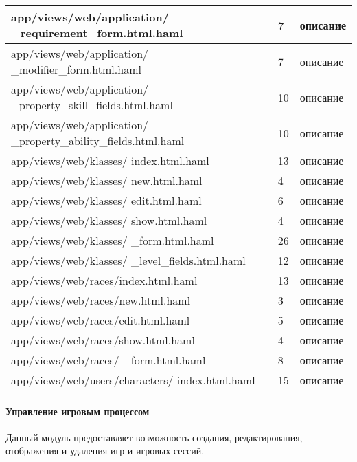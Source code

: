 \begin{longtable}[h]{| p{} | p{} | p{} |}
  \hline
  app/views/web/application/ \_requirement\_form.html.haml  &  7  &  описание \\
  \hline
  app/views/web/application/ \_modifier\_form.html.haml  &  7  &  описание \\
  \hline
  app/views/web/application/ \_property\_skill\_fields.html.haml  &  10  &  описание \\
  \hline
  app/views/web/application/ \_property\_ability\_fields.html.haml  &  10  &  описание \\
  \hline
  app/views/web/klasses/ index.html.haml  &  13  &  описание \\
  \hline
  app/views/web/klasses/ new.html.haml  &  4  &  описание \\
  \hline
  app/views/web/klasses/ edit.html.haml  &  6  &  описание \\
  \hline
  app/views/web/klasses/ show.html.haml  &  4  &  описание \\
  \hline
  app/views/web/klasses/ \_form.html.haml  &  26  &  описание \\
  \hline
  app/views/web/klasses/ \_level\_fields.html.haml  &  12  &  описание \\
  \hline
  app/views/web/races/index.html.haml  &  13  &  описание \\
  \hline
  app/views/web/races/new.html.haml  &  3  &  описание \\
  \hline
  app/views/web/races/edit.html.haml  &  5  &  описание \\
  \hline
  app/views/web/races/show.html.haml  &  4  &  описание \\
  \hline
  app/views/web/races/ \_form.html.haml  &  8  &  описание \\
  \hline
  app/views/web/users/characters/ index.html.haml  &  15  &  описание \\
  \hline
\end{longtable}


\paragraph{Управление игровым процессом}

Данный модуль предоставляет возможность создания, редактирования, отображения и удаления игр и игровых сессий.

